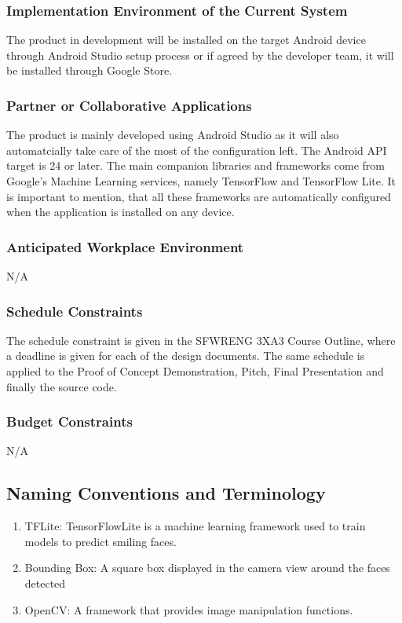 \documentclass[12pt, titlepage]{article}
\begin{document}
\subsubsection{Implementation Environment of the Current System}
{\color{red}
The product in development will be installed on the target Android device through Android Studio setup process or if agreed by the developer team, it will be installed through Google Store. }
\subsubsection{Partner or Collaborative Applications}
{\color{red}
The product is mainly developed using Android Studio as it will also automatcially take care of the most of the configuration left. The Android API target is 24 or later. The main companion libraries and frameworks come from Google's Machine Learning services, namely TensorFlow and TensorFlow Lite. It is important to mention, that all these frameworks are automatically configured when the application is installed on any device.
}
\subsubsection{Anticipated Workplace Environment}
{\color{red}
N/A}
\subsubsection{Schedule Constraints}
{\color{red} The schedule constraint  is given in the SFWRENG 3XA3 Course Outline, where a deadline is given for each of the design documents. The same schedule is applied to the Proof of Concept Demonstration, Pitch, Final Presentation and finally the source code.  
}
\subsubsection{Budget Constraints}
{\color{red}N/A}
\subsection{Naming Conventions and Terminology}
\begin{enumerate}
\item  TFLite:  TensorFlowLite is a machine learning framework used to train models to predict smiling faces.
\item Bounding Box:  A square box displayed in the camera view around the faces detected
\item OpenCV:  A framework that provides image manipulation functions.
\end{enumerate}
\end{document}
